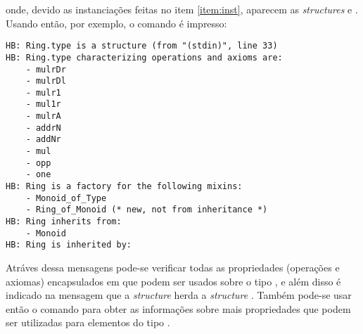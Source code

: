 {{\begin{enumerate}
        onde, devido as instanciações feitas no item \ref{item:inst}, aparecem as \textit{structures}  e . Usando então, por exemplo, o comando  é impresso:
            \begin{lstlisting}[language=coq-error, frame=single, tabsize=1]
HB: Ring.type is a structure (from "(stdin)", line 33)
HB: Ring.type characterizing operations and axioms are:
    - mulrDr
    - mulrDl
    - mulr1
    - mul1r
    - mulrA
    - addrN
    - addNr
    - mul
    - opp
    - one
HB: Ring is a factory for the following mixins:
    - Monoid_of_Type
    - Ring_of_Monoid (* new, not from inheritance *)
HB: Ring inherits from:
    - Monoid
HB: Ring is inherited by:
            \end{lstlisting}
    Atráves dessa mensagens pode-se verificar todas as propriedades (operações e axiomas) encapsulados em  que podem ser usados sobre o tipo , e além disso é indicado na mensagem que a \textit{structure}  herda a \textit{structure} . Também pode-se usar então o comando  para obter as informações sobre mais propriedades que podem ser utilizadas para elementos do tipo  \cite{mathcomp-contributing}.


    \end{enumerate}





    
        

}}
